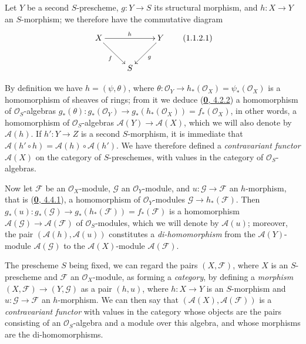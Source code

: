 \begin{env}[1.1.2]
\label{II.1.1.2}
Let $Y$ be a second $S$-prescheme, $g:Y\to S$ its structural morphism,
and $h:X\to Y$ an $S$-morphism; we therefore have the commutative diagram
\[
  \xymatrix{
    X\ar[rr]^h\ar[rd]_f && Y\ar[ld]^g\\
    & S
  }
  \tag{1.1.2.1}\label{II.1.1.2.1}
\]

By definition we have $h=(\psi,\theta)$, where
$\theta:\mathcal{O}_Y\to h_*(\mathcal{O}_X)=\psi_*(\mathcal{O}_X)$ is a
homomorphism of sheaves of rings; from it we deduce
(\hyperref[0.4.2.2]{\textbf{0}, 4.2.2}) a homomorphism of
$\mathcal{O}_S$-algebras $g_*(\theta):g_*(\mathcal{O}_Y)\to g_*(h_*(\mathcal{O}_X))=f_*(\mathcal{O}_X)$,
in other words, a homomorphism of $\mathcal{O}_S$-algebras
$\mathcal{A}(Y)\to\mathcal{A}(X)$, which we will also denote by
$\mathcal{A}(h)$. If $h':Y\to Z$ is a second $S$-morphism, it is immediate
that $\mathcal{A}(h'\circ h)=\mathcal{A}(h)\circ\mathcal{A}(h')$. We have
therefore defined a \emph{contravariant functor} $\mathcal{A}(X)$ on the
category of $S$-preschemes, with values in the category of
$\mathcal{O}_S$-algebras.

Now let $\mathcal{F}$ be an $\mathcal{O}_X$-module, $\mathcal{G}$ an
$\mathcal{O}_Y$-module, and $u:\mathcal{G}\to\mathcal{F}$ an $h$-morphism,
that is (\hyperref[0.4.4.1]{\textbf{0}, 4.4.1}), a homomorphism of
$\mathcal{O}_Y$-modules $\mathcal{G}\to h_*(\mathcal{F})$. Then $g_*(u):g_*(\mathcal{G})\to g_*(h_*(\mathcal{F}))=f_*(\mathcal{F})$
is a homomorphism $\mathcal{A}(\mathcal{G})\to
\mathcal{A}(\mathcal{F})$ of $\mathcal{O}_S$-modules, which we will denote by
$\mathcal{A}(u)$; moreover, the pair
$(\mathcal{A}(h),\mathcal{A}(u))$ constitutes a \emph{di-homomorphism} from
the $\mathcal{A}(Y)$-module $\mathcal{A}(\mathcal{G})$ to the
$\mathcal{A}(X)$-module $\mathcal{A}(\mathcal{F})$.
\end{env}

\begin{env}[1.1.3]
\label{II.1.1.3}
The prescheme $S$ being fixed, we can regard the pairs
$(X,\mathcal{F})$, where $X$ is an $S$-prescheme and $\mathcal{F}$ an
$\mathcal{O}_X$-module, as forming a \emph{category}, by defining a
\emph{morphism} $(X,\mathcal{F})\to(Y,\mathcal{G})$ as a pair $(h,u)$,
where $h:X\to Y$ is an $S$-morphism and $u:\mathcal{G}\to\mathcal{F}$ an
$h$-morphism. We can then say that
$(\mathcal{A}(X),\mathcal{A}(\mathcal{F}))$ is a \emph{contravariant
functor} with values in the category whose objects are the pairs
consisting of an $\mathcal{O}_S$-algebra and a module over this algebra, and
whose morphisms are the di-homomorphisms.
\end{env}

